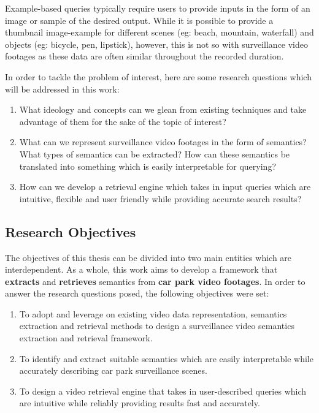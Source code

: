 Example-based queries typically require users to provide inputs in the form of an image or sample of the desired output. While it is possible to provide a thumbnail image-example for different scenes (eg: beach, mountain, waterfall) and objects (eg: bicycle, pen, lipstick), however, this is not so with surveillance video footages as these data are often similar throughout the recorded duration. 

In order to tackle the problem of interest, here are some research questions which will be addressed in this work:
\begin{enumerate}  
\item What ideology and concepts can we glean from existing techniques and take advantage of them for the sake of the topic of interest? 
\item What can we represent surveillance video footages in the form of semantics? What types of semantics can be extracted? How can these semantics be translated into something which is easily interpretable for querying?
\item How can we develop a retrieval engine which takes in input queries which are intuitive, flexible and user friendly while providing accurate search results? 
\end{enumerate}



\subsection{Research Objectives}
The objectives of this thesis can be divided into two main entities which are interdependent. As a whole, this work aims to develop a framework that \textbf{extracts} and \textbf{retrieves} semantics from \textbf{car park video footages}. In order to answer the research questions posed, the following objectives were set:

\begin{enumerate}  
\item To adopt and leverage on existing video data representation, semantics extraction and retrieval methods to design a surveillance video semantics extraction and retrieval framework.   
\item To identify and extract suitable semantics which are easily interpretable while accurately describing car park surveillance scenes.
\item To design a video retrieval engine that takes in user-described queries which are intuitive while reliably providing results fast and accurately. 
\end{enumerate}

